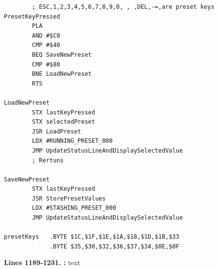 \begin{lstlisting}
        ; ESC,1,2,3,4,5,6,7,8,9,0, , ,DEL,-=,are preset keys
PresetKeyPressed   
        PLA 
        AND #$C0
        CMP #$40
        BEQ SaveNewPreset
        CMP #$80
        BNE LoadNewPreset
        RTS 

LoadNewPreset   
        STX lastKeyPressed
        STX selectedPreset
        JSR LoadPreset
        LDX #RUNNING_PRESET_000
        JMP UpdateStatusLineAndDisplaySelectedValue
        ; Rertuns

SaveNewPreset   
        STX lastKeyPressed
        JSR StorePresetValues
        LDX #STASHING_PRESET_000
        JMP UpdateStatusLineAndDisplaySelectedValue

presetKeys   .BYTE $1C,$1F,$1E,$1A,$18,$1D,$1B,$33
             .BYTE $35,$30,$32,$36,$37,$34,$0E,$0F
\end{lstlisting}

\clearpage

\textbf{Lines 1189-1231. :} 
text



